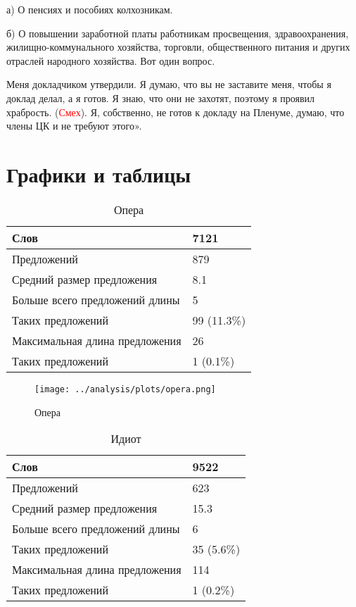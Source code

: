 \documentclass{kursa4}
\begin{document}
{      {а) О пенсиях и пособиях колхозникам.}

      {б) О повышении заработной платы работникам просвещения, здравоохранения, жилищно-коммунального хозяйства, торговли, общественного питания и других отраслей народного хозяйства. Вот один вопрос.}

      {Меня докладчиком утвердили. Я думаю, что вы не заставите меня, чтобы я доклад делал, а я готов. Я знаю, что они не захотят, поэтому я проявил храбрость. (}\textcolor{red}{Смех}{). Я, собственно, не готов к докладу на Пленуме, думаю, что члены ЦК и не требуют этого».}

    \section*{Графики и таблицы}

    \pagebreak
    \begin{samepage} %
      \begin{table}
        \centering     
        \tablehead{} %
        \begin{tabular}{|m{10cm}|m{3cm}|}
          \hline
          Слов & 7121\\\hline
          Предложений & 879\\\hline
          Средний размер предложения & 8.1\\\hline
          Больше всего предложений длины & 5\\\hline
          Таких предложений & 99 (11.3\%)\\\hline
          Максимальная длина предложения & 26\\\hline
          Таких предложений & 1 (0.1\%)\\\hline
        \end{tabular}
        \caption{Опера}
      \end{table} 
      
      \begin{figure}[htbp] \centering
        \texttt{[image: ../analysis/plots/opera.png]}
        \caption{Опера}
      \end{figure}
    \end{samepage}


      \begin{table}
        \centering
        \tablehead{}
        \begin{tabular}{|m{10cm}|m{3cm}|}
          \hline
          Слов & 9522\\\hline
          Предложений & 623\\\hline
          Средний размер предложения & 15.3\\\hline
          Больше всего предложений длины & 6\\\hline
          Таких предложений & 35 (5.6\%)\\\hline
          Максимальная длина предложения & 114\\\hline
          Таких предложений & 1 (0.2\%)\\\hline
        \end{tabular}
        \caption{Идиот}
      \end{table}

}
\end{document}
